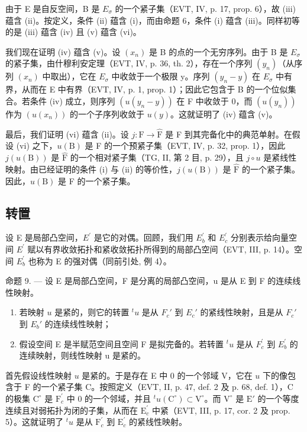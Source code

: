 由于 E 是自反空间，B 是 \(E_{\sigma}\) 的一个紧子集（EVT, IV, p. 17, prop. 6），故 (iii) 蕴含 (ii)。按定义，条件 (ii) 蕴含 (i)，而由命题 6，条件 (i) 蕴含 (iii)。同样初等的是 (iii) 蕴含 (iv) 且 (v) 蕴含 (vi)。

我们现在证明 (iv) 蕴含 (v)。设 \((x_{n})\) 是 B 的点的一个无穷序列。由于 B 是 \(E_{\sigma}\) 的紧子集，由什穆利安定理（EVT, IV, p. 36, th. 2），存在一个序列 \((y_{n})\)（从序列 \((x_{n})\) 中取出），它在 \(E_{\sigma}\) 中收敛于一个极限 y。序列 \((y_{n}-y)\) 在 \(E_{\sigma}\) 中有界，从而在 E 中有界（EVT, IV, p. 1, prop. 1）；因此它包含于 B 的一个位似集合。若条件 (iv) 成立，则序列 \((u(y_{n}-y))\) 在 F 中收敛于 0，而 \((u(y_{n}))\) 作为 \((u(x_{n}))\) 的一个子序列收敛于 \(u(y)\)。这就证明了 (iv) 蕴含 (v)。

最后，我们证明 (vi) 蕴含 (ii)。设 \(j: \mathrm{F} \to \widehat{\mathrm{F}}\) 是 F 到其完备化中的典范单射。在假设 (vi) 之下，\(u(\mathrm{B})\) 是 F 的一个预紧子集（EVT, IV, p. 32, prop. 1），因此 \(j(u(\mathrm{B}))\) 是 \(\widehat{\mathrm{F}}\) 的一个相对紧子集（TG, II, 第 2 目, p. 29），且 \(j \circ u\) 是紧线性映射。由已经证明的条件 (i) 与 (ii) 的等价性，\(j(u(\mathrm{B}))\) 是 \(\widehat{\mathrm{F}}\) 的一个紧子集。因此，\(u(\mathrm{B})\) 是 F 的一个紧子集。

\subsection{转置}

设 E 是局部凸空间，\(E^{\prime}\) 是它的对偶。回顾，我们用 \(E_{b}^{\prime}\) 和 \(E_{c}^{\prime}\) 分别表示给向量空间 \(E^{\prime}\) 赋以有界收敛拓扑和紧收敛拓扑所得到的局部凸空间（EVT, III, p. 14）。空间 \(E_{b}^{\prime}\) 也称为 E 的强对偶（同前引处, 例 4）。

命题 9. --- 设 E 是局部凸空间，F 是分离的局部凸空间，u 是从 E 到 F 的连续线性映射。

\begin{enumerate}
\def\labelenumi{\alph{enumi})}
\item
  若映射 \(u\) 是紧的，则它的转置 \(^{t}u\) 是从 \(F_c'\) 到 \(E_c'\) 的紧线性映射，且是从 \(F_c'\) 到 \(E_b'\) 的连续线性映射；
\item
  假设空间 E 是半赋范空间且空间 F 是拟完备的。若转置 \({}^{t}u\) 是从 \(F_{c}^{\prime}\) 到 \(E_{b}^{\prime}\) 的连续映射，则线性映射 u 是紧的。
\end{enumerate}

首先假设线性映射 \(u\) 是紧的。于是存在 E 中 0 的一个邻域 V，它在 \(u\) 下的像包含于 F 的一个紧子集 C。按照定义（EVT, II, p. 47, def. 2 及 p. 68, def. 1），C 的极集 \(\mathrm{C}^{\circ}\) 是 \(\mathrm{F}_c^\prime\) 中 0 的一个邻域，并且 \({}^t u(\mathrm{C}^\circ) \subset \mathrm{V}^\circ\)。而 \(\mathrm{V}^\circ\) 是 \(\mathrm{E}'\) 的一个等度连续且对弱拓扑为闭的子集，从而在 \(\mathrm{E}_c^\prime\) 中紧（EVT, III, p. 17, cor. 2 及 prop. 5）。这就证明了 \({}^t u\) 是从 \(\mathrm{F}_c^\prime\) 到 \(\mathrm{E}_c^\prime\) 的紧线性映射。

